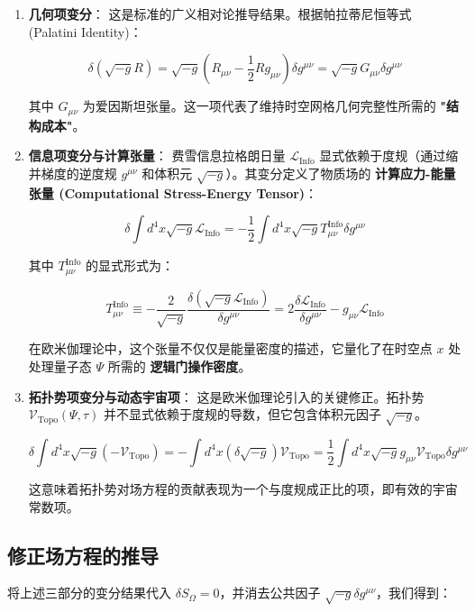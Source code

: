 \begin{enumerate}
\item \textbf{几何项变分}：
   这是标准的广义相对论推导结果。根据帕拉蒂尼恒等式 (Palatini Identity)：

\[\delta (\sqrt{-g} R) = \sqrt{-g} \left( R_{\mu\nu} - \frac{1}{2} R g_{\mu\nu} \right) \delta g^{\mu\nu} = \sqrt{-g} G_{\mu\nu} \delta g^{\mu\nu}\]

其中 $G_{\mu\nu}$ 为爱因斯坦张量。这一项代表了维持时空网格几何完整性所需的 \textbf{"结构成本"}。

\item \textbf{信息项变分与计算张量}：
   费雪信息拉格朗日量 $\mathcal{L}_{\text{Info}}$ 显式依赖于度规（通过缩并梯度的逆度规 $g^{\mu\nu}$ 和体积元 $\sqrt{-g}$）。其变分定义了物质场的 \textbf{计算应力-能量张量 (Computational Stress-Energy Tensor)}：

\[\delta \int d^4x \sqrt{-g} \mathcal{L}_{\text{Info}} = -\frac{1}{2} \int d^4x \sqrt{-g} T_{\mu\nu}^{\text{Info}} \delta g^{\mu\nu}\]

其中 $T_{\mu\nu}^{\text{Info}}$ 的显式形式为：

\[T_{\mu\nu}^{\text{Info}} \equiv -\frac{2}{\sqrt{-g}} \frac{\delta (\sqrt{-g} \mathcal{L}_{\text{Info}})}{\delta g^{\mu\nu}} = 2 \frac{\delta \mathcal{L}_{\text{Info}}}{\delta g^{\mu\nu}} - g_{\mu\nu} \mathcal{L}_{\text{Info}}\]

在欧米伽理论中，这个张量不仅仅是能量密度的描述，它量化了在时空点 $x$ 处处理量子态 $\Psi$ 所需的 \textbf{逻辑门操作密度}。

\item \textbf{拓扑势项变分与动态宇宙项}：
   这是欧米伽理论引入的关键修正。拓扑势 $\mathcal{V}_{\text{Topo}}(\Psi, \tau)$ 并不显式依赖于度规的导数，但它包含体积元因子 $\sqrt{-g}$。

\[\delta \int d^4x \sqrt{-g} (-\mathcal{V}_{\text{Topo}}) = -\int d^4x (\delta \sqrt{-g}) \mathcal{V}_{\text{Topo}} = \frac{1}{2} \int d^4x \sqrt{-g} g_{\mu\nu} \mathcal{V}_{\text{Topo}} \delta g^{\mu\nu}\]

这意味着拓扑势对场方程的贡献表现为一个与度规成正比的项，即有效的宇宙常数项。
\end{enumerate}

\subsection{修正场方程的推导}

将上述三部分的变分结果代入 $\delta S_{\Omega} = 0$，并消去公共因子 $\sqrt{-g} \delta g^{\mu\nu}$，我们得到：

